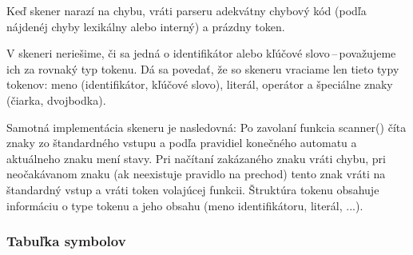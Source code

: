 \documentclass[a4paper, 12pt]{article}
\begin{document}
Keď skener narazí na chybu, vráti parseru adekvátny chybový kód (podľa nájdenéj chyby lexikálny alebo interný) a prázdny token.

V skeneri neriešime, či sa jedná o identifikátor alebo kľúčové slovo\,--\,považujeme ich za rovnaký typ tokenu. Dá sa povedať, že so skeneru vraciame len tieto typy tokenov: meno (identifikátor, kľúčové slovo), literál, operátor a špeciálne znaky (čiarka, dvojbodka).

Samotná implementácia skeneru je nasledovná:
Po zavolaní funkcia scanner() číta znaky zo štandardného vstupu a podľa pravidiel konečného automatu a aktuálneho znaku mení stavy. Pri načítaní zakázaného znaku vráti chybu, pri neočakávanom znaku (ak neexistuje pravidlo na prechod) tento znak vráti na štandardný vstup a vráti token volajúcej funkcii. Štruktúra tokenu obsahuje informáciu o type tokenu a jeho obsahu (meno identifikátoru, literál, ...).

\subsubsection{Tabuľka symbolov}
\end{document}
